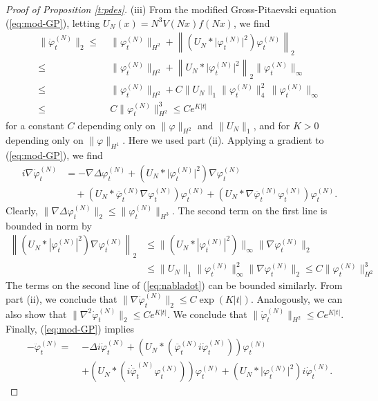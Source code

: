 \documentclass[11pt,a4paper]{article}
\newcommand{\norm}[1]{\lVert#1\rVert}	%
\newcommand{\ph}{\varphi_t^{(N)}}	%
\newcommand{\phdot}{\dot{\varphi}_t^{(N)}}	%
\newcommand{\phddot}{\ddot{\varphi}_t^{(N)}}	%
\begin{document}
\begin{proof}[Proof of Proposition \ref{t:pdes}]
(iii) {F}rom the modified Gross-Pitaevski equation (\ref{eq:mod-GP}), letting $U_N (x) = N^3 V(Nx) f(Nx)$, we find
\[ \begin{split}
\norm{\phdot}_{2} \leq \; & \norm{\ph}_{H^2} + \left\| \left(U_N * \lvert \ph\rvert^2 \right)\ph \right\|_2 \\  \leq \; & \norm{\ph}_{H^2} + \left\| U_N * \lvert \ph\rvert^2 \right\|_2 \| \ph \|_\infty \\ \leq \; &
 \norm{\ph}_{H^2} + C \| U_N \|_1 \| \ph \|_4^2 \, \| \ph \|_\infty \\ \leq \;  &C \| \ph \|_{H^2}^3 \leq C e^{K |t|} 
\end{split} \]
for a constant $C$ depending only on $\| \varphi \|_{H^2}$ and $\| U_N \|_1$, and for $K >0$ depending only on $\| \varphi \|_{H^1}$. Here we used part (ii). Applying a gradient to (\ref{eq:mod-GP}), we find 
\begin{equation}\label{eq:nabladot} \begin{split}
i \nabla \phdot & = - \nabla \Delta \ph + \left( U_N \ast \lvert \ph \rvert^2 \right) \nabla \ph \\
& \quad + \left( U_N \ast \overline{\varphi}_t^{(N)} \nabla \ph \right) \ph + \left( U_N \ast  \nabla \overline{\varphi}_t^{(N)} \ph \right) \ph. 
\end{split} \end{equation}
Clearly, $\norm{\nabla \Delta \ph}_{2} \leq \norm{\ph}_{H^3}$. The second term on the first line is bounded in norm by
\[\begin{split}  \left\| (U_N * |\varphi_t^{(N)}|^2) \nabla \ph \right\|_2 & \leq \| (U_N * |\varphi_t^{(N)}|^2)  \|_{\infty}   \| \nabla \ph \|_2 \\ &\leq  \|U_N\|_1 \|\varphi_t^{(N)}\|_\infty^2    \| \nabla \ph \|_2 \leq C \| \ph \|_{H^2}^3 \end{split} \]
The terms on the second line of (\ref{eq:nabladot}) can be bounded similarly. {F}rom part (ii), we conclude that $\| \nabla \dot{\varphi}_t^{(N)} \|_2 \leq C \exp (K |t|)$. Analogously, we can also show that $\| \nabla^2 \dot{\varphi}_t^{(N)} \|_2 \leq C e^{K |t|}$. We conclude that $\| \dot{\varphi}^{(N)}_t\|_{H^2} \leq C e^{K |t|}$. Finally, (\ref{eq:mod-GP}) implies 
\[ \begin{split}
-\phddot  = \; &-\Delta i \phdot + \left( U_N \ast (\overline{\varphi}_t^{(N)} i \phdot)\right) \ph \\
&+ \left( U_N \ast (i\dot{\overline{\varphi}}_t^{(N)} \ph) \right) \ph + \left( U_N \ast \lvert\ph\rvert^2 \right) i \phdot.

\end{split}\]
\end{proof}
\end{document}
